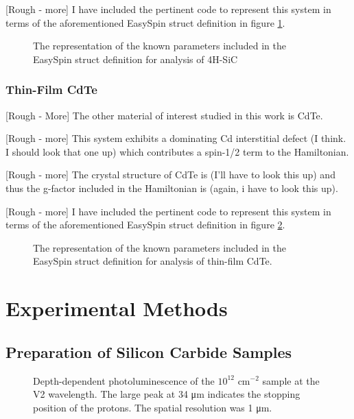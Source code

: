\documentclass[oneside, astronomy, noacknowlegments]{BYUPhys}
\begin{document}
[Rough - more] I have included the pertinent code to represent this system in terms of the aforementioned EasySpin struct definition in figure \ref{fig:SiCParams}.

\begin{figure}
    \caption[The \textit{EasySpin} representation of SiC]{\label{fig:SiCParams}
     The representation of the known parameters included in the EasySpin struct definition for analysis of 4H-SiC}
 \end{figure}
 
\subsection{Thin-Film CdTe}

[Rough - More] The other material of interest studied in this work is CdTe.

[Rough - more] This system exhibits a dominating Cd interstitial defect (I think. I should look that one up) which contributes a spin-1/2 term to the Hamiltonian.

[Rough - more] The crystal structure of CdTe is (I’ll have to look this up) and thus the g-factor included in the Hamiltonian is (again, i have to look this up).

[Rough - more] I have included the pertinent code to represent this system in terms of the aforementioned EasySpin struct definition in figure \ref{fig:CdTeParams}.

\begin{figure}
    \caption[The \textit{EasySpin} representation of CdTe]{\label{fig:CdTeParams}
     The representation of the known parameters included in the EasySpin struct definition for analysis of thin-film CdTe.}
 \end{figure}
 










\chapter{Experimental Methods}

\section{Preparation of Silicon Carbide Samples}
\label{sec:SiCSamples}
\begin{figure}
    \caption[SiC Depth-Dependent Photoluminescence]{\label{fig:SiCDepth}
     Depth-dependent photoluminescence of the $10^{12}$ $\text{cm}^{−2}$ sample at the V2 wavelength. The large peak at 34 μm indicates the stopping position of the protons. The spatial resolution was 1 μm.}
 \end{figure}
\end{document}
